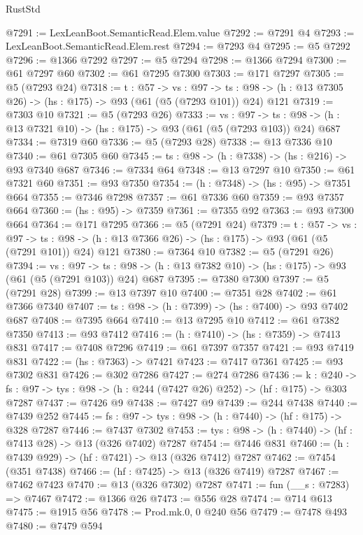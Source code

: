 \begin{lexlean}{RustStd}
\begin{coremodule}
@7291 := LexLeanBoot.SemanticRead.Elem.value
@7292 := @7291 @4
@7293 := LexLeanBoot.SemanticRead.Elem.rest
@7294 := @7293 @4
@7295 := @5 @7292
@7296 := @1366 @7292
@7297 := @5 @7294
@7298 := @1366 @7294
@7300 := @61 @7297 @60
@7302 := @61 @7295 @7300
@7303 := @171 @7297
@7305 := @5 (@7293 @24)
@7318 := {t : @57} ->
  {vs : @97} ->
  {ts : @98} -> (h : @13 @7305 @26) -> (hs : @175) -> @93 (@61 (@5 (@7293 @101)) @24) @121
@7319 := @7303 @10
@7321 := @5 (@7293 @26)
@7333 := {vs : @97} ->
  {ts : @98} -> (h : @13 @7321 @10) -> (hs : @175) -> @93 (@61 (@5 (@7293 @103)) @24) @687
@7334 := @7319 @60
@7336 := @5 (@7293 @28)
@7338 := @13 @7336 @10
@7340 := @61 @7305 @60
@7345 := {ts : @98} -> (h : @7338) -> (hs : @216) -> @93 @7340 @687
@7346 := @7334 @64
@7348 := @13 @7297 @10
@7350 := @61 @7321 @60
@7351 := @93 @7350
@7354 := (h : @7348) -> (hs : @95) -> @7351 @664
@7355 := @7346 @7298
@7357 := @61 @7336 @60
@7359 := @93 @7357 @664
@7360 := (hs : @95) -> @7359
@7361 := @7355 @92
@7363 := @93 @7300 @664
@7364 := @171 @7295
@7366 := @5 (@7291 @24)
@7379 := {t : @57} ->
  {vs : @97} ->
  {ts : @98} -> (h : @13 @7366 @26) -> (hs : @175) -> @93 (@61 (@5 (@7291 @101)) @24) @121
@7380 := @7364 @10
@7382 := @5 (@7291 @26)
@7394 := {vs : @97} ->
  {ts : @98} -> (h : @13 @7382 @10) -> (hs : @175) -> @93 (@61 (@5 (@7291 @103)) @24) @687
@7395 := @7380 @7300
@7397 := @5 (@7291 @28)
@7399 := @13 @7397 @10
@7400 := @7351 @28
@7402 := @61 @7366 @7340
@7407 := {ts : @98} -> (h : @7399) -> (hs : @7400) -> @93 @7402 @687
@7408 := @7395 @664
@7410 := @13 @7295 @10
@7412 := @61 @7382 @7350
@7413 := @93 @7412
@7416 := (h : @7410) -> (hs : @7359) -> @7413 @831
@7417 := @7408 @7296
@7419 := @61 @7397 @7357
@7421 := @93 @7419 @831
@7422 := (hs : @7363) -> @7421
@7423 := @7417 @7361
@7425 := @93 @7302 @831
@7426 := @302 @7286
@7427 := @274 @7286
@7436 := {k : @240} ->
  {fs : @97} -> {tys : @98} -> (h : @244 (@7427 @26) @252) -> (hf : @175) -> @303 @7287
@7437 := @7426 @9
@7438 := @7427 @9
@7439 := @244 @7438
@7440 := @7439 @252
@7445 := {fs : @97} -> {tys : @98} -> (h : @7440) -> (hf : @175) -> @328 @7287
@7446 := @7437 @7302
@7453 := {tys : @98} -> (h : @7440) -> (hf : @7413 @28) -> @13 (@326 @7402) @7287
@7454 := @7446 @831
@7460 := (h : @7439 @929) -> (hf : @7421) -> @13 (@326 @7412) @7287
@7462 := @7454 (@351 @7438)
@7466 := (hf : @7425) -> @13 (@326 @7419) @7287
@7467 := @7462 @7423
@7470 := @13 (@326 @7302) @7287
@7471 := fun (__s : @7283) => @7467
@7472 := @1366 @26
@7473 := @556 @28
@7474 := @714 @613
@7475 := @1915 @56
@7478 := Prod.mk.{0, 0} @240 @56
@7479 := @7478 @493
@7480 := @7479 @594

\end{coremodule}
\end{lexlean}
